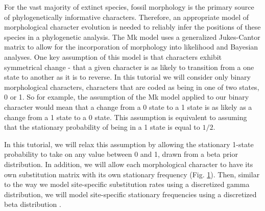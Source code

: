For the vast majority of extinct species, fossil morphology is the primary source of phylogenetically informative characters.
Therefore, an appropriate model of morphological character evolution is needed to reliably infer the positions of these species in a phylogenetic analysis.
The Mk model \citep{Lewis2001} uses a generalized Jukes-Cantor matrix to allow for the incorporation of morphology into likelihood and Bayesian analyses.
One key assumption of this model is that characters exhibit symmetrical change - that a given character is as likely to transition from a one state to another as it is to reverse.
In this tutorial we will consider only binary morphological characters, \IE characters that are coded as being in one of two states, 0 or 1.
So for example, the assumption of the Mk model applied to our binary character would mean that a change from a 0 state to a 1 state is as likely as a change from a 1 state to a 0 state.
This assumption is equivalent to assuming that the stationary probability of being in a 1 state is equal to $1/2$.

In this tutorial, we will relax this assumption by allowing the stationary 1-state probability to take on any value between 0 and 1, drawn from a beta prior distribution.
In addition, we will allow each morphological character to have its own substitution matrix with its own stationary frequency (Fig. \ref{fig:morpho_gm}).
Then, similar to the way we model site-specific substitution rates using a discretized gamma distribution, %
we will model site-specific stationary frequencies using a discretized beta distribution \citep{Wright2016}.
\begin{figure}[h!]
\label{fig:morpho_gm}
\end{figure}

